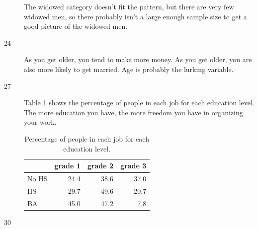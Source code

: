 \documentclass[letterpaper, landscape]{exam}
\begin{document}
\begin{description}
\begin{parts}
          The widowed category doesn't fit the pattern, but there are very few
          widowed men, so there probably isn't a large enough sample size to get a
          good picture of the widowed men.

      \end{parts}

    \item[24] As you get older, you tend to make more money.  As you get older, you
      are also more likely to get married.  Age is probably the lurking variable.

    \item[27]
      Table \ref{tab:ex27} shows the percentage of people in each job for each
      education level.  The more education you have, the more freedom you have
      in organizing your work.

      \begin{table}[H]
        \centering
        \begin{tabular}{lrrr}
          \toprule
                & grade 1 & grade 2 & grade 3     \\
          \midrule
          No HS & 24.4    & 38.6    & 37.0 \\
          HS    & 29.7    & 49.6    & 20.7 \\
          BA    & 45.0    & 47.2    & 7.8  \\
          \bottomrule
        \end{tabular}
        \caption{Percentage of people in each job for each education level.}
        \label{tab:ex27}
      \end{table}


    \newpage

    \item[30]




\end{description}
\end{document}
